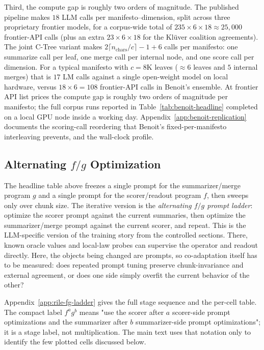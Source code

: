 Third, the compute gap is roughly two orders of magnitude. The published \citet{BenoitEtAl2025} pipeline makes $18$ LLM calls per
manifesto--dimension, split across three proprietary frontier models,
for a corpus-wide total of $235 \times 6 \times 18 \approx 25{,}000$
frontier-API calls (plus an extra $23 \times 6 \times 18$ for the
Kl\"uver coalition agreements). The joint C-Tree variant makes
$2\lceil n_{\text{chars}}/c\rceil - 1 + 6$ calls per manifesto: one
summarize call per leaf, one merge call per internal node, and one
score call per dimension. For a typical manifesto with $c = 8\mathrm{K}$
leaves ($\approx 6$ leaves and $5$ internal merges) that is $17$ LM
calls against a single open-weight model on local hardware, versus
$18 \times 6 = 108$ frontier-API calls in Benoit's ensemble. At frontier
API list prices the compute gap is roughly two orders of magnitude per
manifesto; the full corpus runs reported in
Table~\ref{tab:benoit-headline} completed on a local GPU node inside a
working day. Appendix~\ref{app:benoit-replication} documents the
scoring-call reordering that Benoit's fixed-per-manifesto interleaving
prevents, and the wall-clock profile.

\subsection[Alternating f/g Optimization]{Alternating $f/g$ Optimization}\label{sec:rile-fg-ladder}

The headline table above freezes a single prompt for the summarizer/merge
program $g$ and a single prompt for the scorer/readout program $f$, then
sweeps only over chunk size. The iterative version is the
\emph{alternating $f/g$ prompt ladder}: optimize the scorer prompt against
the current summaries, then optimize the summarizer/merge prompt against
the current scorer, and repeat. This is the LLM-specific version of the
training story from the controlled sections. There, known oracle values
and local-law probes can supervise the operator and readout directly.
Here, the objects being changed are prompts, so co-adaptation itself has
to be measured: does repeated prompt tuning preserve chunk-invariance and
external agreement, or does one side simply overfit the current behavior
of the other?

Appendix~\ref{app:rile-fg-ladder} gives the full stage sequence and the
per-cell table. The compact label $f^a g^b$ means "use the scorer after
$a$ scorer-side prompt optimizations and the summarizer after $b$
summarizer-side prompt optimizations"; it is a stage label, not
multiplication. The main text uses that notation only to identify the
few plotted cells discussed below.

